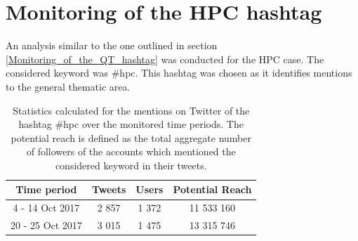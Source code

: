 \section{Monitoring of the HPC hashtag} \label{Monitoring_of_the_HPC_hashtag}
An analysis similar to the one outlined in section \ref{Monitoring_of_the_QT_hashtag} was conducted for the HPC case. The considered keyword was \#hpc. This hashtag was chosen as it identifies mentions to the general thematic area.

\begin{table}[t]
 \begin{center}
  \begin{tabular}{cccc}
   \hline 
   \hline
   Time period & Tweets & Users & Potential Reach \\ 
   \hline
   \hline
   4 - 14 Oct 2017 & 2 857 & 1 372 & 11 533 160  \\
   20 - 25 Oct 2017 & 3 015 & 1 475 & 13 315 746  \\
   \hline
   \hline
  \end{tabular}
 \end{center} 
 \caption{Statistics calculated for the mentions on Twitter of the hashtag \#hpc over the monitored time periods. The potential reach is defined as the total aggregate number of followers of the accounts which mentioned the considered keyword in their tweets.}
\label{Summary_HPC} 
\end{table}

